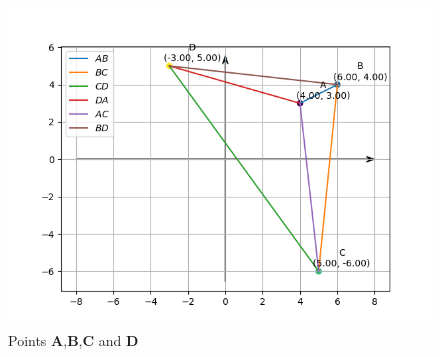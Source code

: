 \documentclass[journal]{IEEEtran}
\begin{document}
\begin{figure}[h]
    \centering
    \includegraphics[width=\columnwidth]{figs/fig1.png}
    \caption{Points \textbf{A},\textbf{B},\textbf{C} and \textbf{D}}
 \end{figure}
\end{document}
